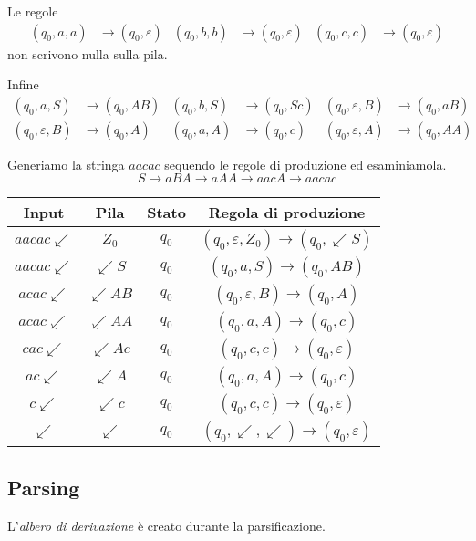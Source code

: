 \documentclass[11pt]{article}
\begin{document}
Le regole
\begin{align*}
    (q_0,a,a)&\rightarrow(q_0,\varepsilon) & (q_0,b,b)&\rightarrow(q_0,\varepsilon) & (q_0,c,c)&\rightarrow(q_0,\varepsilon)
\end{align*}
non scrivono nulla sulla pila. 

Infine
\begin{align*}
    (q_0,a,S)&\rightarrow(q_0,AB) & (q_0,b,S)&\rightarrow(q_0,Sc) & (q_0,\varepsilon,B)&\rightarrow(q_0,aB)\\
    (q_0,\varepsilon,B)&\rightarrow(q_0,A) & (q_0,a,A)&\rightarrow(q_0,c) & (q_0,\varepsilon,A)&\rightarrow(q_0,AA)
\end{align*}

Generiamo la stringa $aacac$ sequendo le regole di produzione ed esaminiamola.
\begin{equation*}
    S\rightarrow aBA\rightarrow aAA \rightarrow aacA \rightarrow aacac
\end{equation*}
\begin{center}
    \begin{tabular}{ |c|c|c|c| }
     \hline
     Input & Pila & Stato & Regola di produzione \\ 
     \hline\hline
     $aacac\swarrow$ & $Z_0$ & $q_0$ & $(q_0,\varepsilon,Z_0)\rightarrow(q_0,\swarrow S)$ \\ 
     $aacac\swarrow$ & $\swarrow S$ & $q_0$ & $(q_0,a,S)\rightarrow(q_0,AB)$ \\ 
     $acac\swarrow$ & $\swarrow AB$ & $q_0$ &  $(q_0,\varepsilon,B)\rightarrow(q_0,A)$\\ 
     $acac\swarrow$ & $\swarrow AA$ & $q_0$ & $(q_0,a,A)\rightarrow(q_0,c)$ \\ 
     $cac\swarrow$ & $\swarrow Ac$ & $q_0$ &  $(q_0,c,c)\rightarrow(q_0,\varepsilon)$\\ 
     $ac\swarrow$ & $\swarrow A$ & $q_0$ & $(q_0,a,A)\rightarrow(q_0,c)$ \\ 
     $c\swarrow$ & $\swarrow c$ & $q_0$ & $(q_0,c,c)\rightarrow(q_0,\varepsilon)$ \\
     $\swarrow$ & $\swarrow$ & $q_0$ & $(q_0,\swarrow,\swarrow)\rightarrow(q_0,\varepsilon)$ \\ 
     \hline
    \end{tabular}
\end{center}
\subsection{Parsing}
L'\textit{albero di derivazione} è creato durante la parsificazione. 
\end{document}
